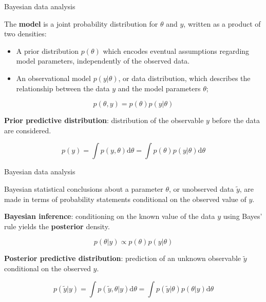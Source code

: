 \documentclass[compress, 10pt]{beamer}
\begin{document}

\begin{frame}{Bayesian data analysis}

The \textbf{model} is a joint probability distribution for $\theta$ and $y$, written as a product of two densities:

\begin{itemize}
    \item A prior distribution $p(\theta)$ which encodes eventual assumptions regarding model parameters, independently of the observed data.
    \item An observational model $p(y|\theta)$, or data distribution, which describes the relationship between the data $y$ and the model parameters $\theta$;
\end{itemize}

\begin{equation*}
    p(\theta,y) = p(\theta) p(y|\theta)
\end{equation*}

\textbf{Prior predictive distribution}: distribution of the observable $y$ before the data are considered.

\begin{equation*}
    p(y) = \int p(y,\theta)\mathrm{d}\theta = \int p(\theta) p(y|\theta) \mathrm{d}\theta
\end{equation*}

\end{frame}


\begin{frame}{Bayesian data analysis}

Bayesian statistical conclusions about a parameter $\theta$, or unobserved data $\tilde{y}$, are made in terms of probability statements conditional on the observed value of $y$.

\hspace{0.5cm}

\textbf{Bayesian inference}: conditioning on the known value of the data $y$ using Bayes' rule yields the \textbf{posterior} density.

\begin{equation*}
    p(\theta | y) \propto p(\theta) p(y|\theta) 
\end{equation*}

\textbf{Posterior predictive distribution}: prediction of an unknown observable $\tilde{y}$ conditional on the observed $y$.

\begin{equation*}
    p(\tilde{y}|y) = \int p(\tilde{y},\theta|y) \mathrm{d} \theta = \int p(\tilde{y} |\theta)p(\theta|y) \mathrm{d}\theta
\end{equation*}

\end{frame}
\end{document}
